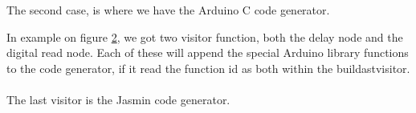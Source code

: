 \begin{figure}[H]
\centering
{}
\label{io01}
\end{figure}
The second case, is where we have the Arduino C code generator.
\begin{figure}[H]
\centering
{}
\caption{}
\label{io02}
\end{figure}
In example on figure \ref{io02}, we got two visitor function, both the delay node and the digital read node. Each of these will append the special Arduino library functions to the code generator, if it read the function id as both within the buildastvisitor. \\
\\
The last visitor is the Jasmin code generator.\\
